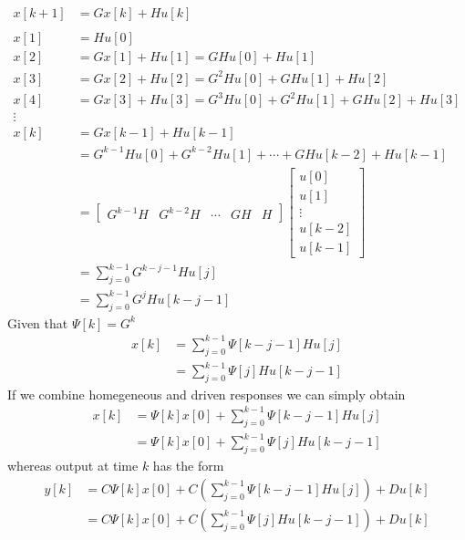 \documentclass[twoside]{article}
\begin{document}
\begin{align*}
  x[k+1] &= G x[k] + H u[k] 
  \\
  \\
  x[1] &= H u[0]
  \\
  x[2] &= G x[1] + H u[1] = G H u[0] + H u[1] 
  \\
  x[3] &= G x[2] + H u[2] = G^2 H u[0] + G H u[1] + H u[2]
  \\
  x[4] &= G x[3] + H u[3] = G^3 H u[0] + G^2 H u[1] + G H u[2] + H
         u[3]
  \\
  \vdots
 \\
  x[k] &= G x[k-1] + H u[k-1] \\
         &= G^{k-1} H u[0] + G^{k-2} H u[1] +
         \cdots + G H u[k-2] + H u[k-1]
         \\
         &= \left[ \begin{array}{c|c|c|c|c} G^{k-1} H & G^{k-2} H &
         \cdots & G H & H \end{array} \right]
         \left[ \begin{array}{c}
                  u[0] \\ u[1] \\ \vdots \\ u[k-2] \\ u[k-1]
         \end{array} \right]
         \\
         &= \sum\limits_{j = 0}^{k-1} G^{k-j-1} H u[j]
         \\
         &= \sum\limits_{j = 0}^{k-1} G^{j} H u[k-j-1]
\end{align*}
%
Given that $\Psi[k] = G^k$
%
\begin{align*}
    x[k] &= \sum\limits_{j = 0}^{k-1} \Psi[k-j-1] H u[j]
\\
&= \sum\limits_{j = 0}^{k-1} \Psi[j] H u[k-j-1]
\end{align*}
%
If we combine homegeneous and driven responses we can simply obtain
%
\begin{align*}
    x[k] &= \Psi[k] x[0] + \sum\limits_{j = 0}^{k-1} \Psi[k-j-1] H u[j]
\\
&= \Psi[k] x[0] + \sum\limits_{j = 0}^{k-1} \Psi[j] H u[k-j-1]
\end{align*}
% 
whereas output at time $k$ has the form
%
\begin{align*}
    y[k] &= C \Psi[k] x[0] + C \left( \sum\limits_{j = 0}^{k-1}
           \Psi[k-j-1] H u[j] \right) + D u[k]
\\
&= C \Psi[k] x[0] + C \left( \sum\limits_{j = 0}^{k-1} \Psi[j] H
  u[k-j-1] \right) +  D u[k]
\end{align*}
% 
\end{document}
